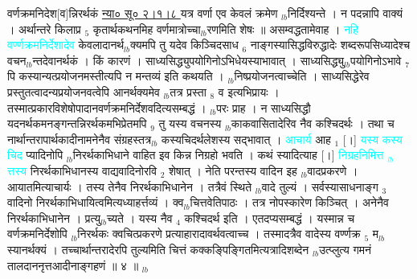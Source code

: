 \documentclass[article,12pt,a4paper]{memoir}%
\newcommand{\quotelemma}[1]{\textcolor{cyan}{#1}}
\newcounter{parCount}
\begin{document}
	  
	  \pstart \leavevmode%
	\hphantom{.}वर्णक्रमनिदेश[व]न्निरर्थकं \href{http://sarit.indology.info/?cref=ns\%C5\%AB.2.1.8}{न्या० सू० २।१।८ } यत्र वर्णा एव केवलं क्रमेण {\tiny $_{lb}$}निर्दिश्यन्ते । न पदन्नापि वाक्यं । अर्थान्तरे किलाप्र {\tiny $_{5}$} कृतार्थकथनमिह वर्णमात्रोच्चा{\tiny $_{lb}$}रणमिति शेषः ॥ असम्वद्धतामेवाह । \quotelemma{नहि वर्ण्णक्रमनिर्देशादेव} \cite[13a9]{vn-msN} केवलादानर्थ{\tiny $_{lb}$}क्यमपि तु यदेव किञ्चिदसाध {\tiny $_{6}$} नाङ्गस्यासिद्धविरुद्धादेः शब्दरूपसिध्यादेश्च वचन{\tiny $_{lb}$}न्तदेवानर्थकं । किं कारणं । साध्यसिद्ध्युपयोगिनोऽभिधेयस्याभावात् । साध्यसिद्ध्यु{\tiny $_{lb}$}पयोगिनोऽभावे {\tiny $_{7}$} पि कस्यान्यत्प्रयोजनमस्तीत्यपि न मन्तव्यं इति कथयति । {\tiny $_{lb}$}निष्प्रयोजनत्वाच्चेति । साध्यसिद्धेरेव प्रस्तुतत्वादन्यप्रयोजनवत्वेपि आनर्थक्यमेव {\tiny $_{lb}$}तत्र प्रस्ता {\tiny $_{8}$} व इत्यभिप्रायः । तस्मात्प्रकारविशेषोपादानवर्णक्रमनिर्देशवदित्यसम्बद्धं । {\tiny $_{lb}$}परः प्राह । न साध्यसिद्धौ यदनर्थकमनङ्गन्तन्निरर्थकमभिप्रेतमपि {\tiny $_{9}$} \leavevmode{} तु यस्य वचनस्य {\tiny $_{lb}$}काकवासितादेरिव नैव कश्चिदर्थः । तथा च नार्थान्तरापार्थकादीनामनेनैव संग्रहस्तत्र{\tiny $_{lb}$}\leavevmode{} कस्यचिदर्थलेशस्य सद्भावात् । \quotelemma{आचार्य} आह {\tiny $_{1}$} [।] \quotelemma{यस्य कस्य चिद} \cite[13b3]{vn-msN} प्यादिनोपि {\tiny $_{lb}$}निरर्थकाभिधाने वाहित इव किन्न निग्रहो भवति । कथं स्यादित्याह [।] \quotelemma{निग्रहनिमित्त {\tiny $_{lb}$}त्तस्य} निरर्थकाभिधानस्य वाद्यवादिनोरवि {\tiny $_{2}$} शेषात् । नेति परन्तस्य वादिन इह {\tiny $_{lb}$}वादप्रकरणे । आयातमित्याचार्यः । तस्य तेनैव निरर्थकाभिधानेन । तत्रैवं स्थिते {\tiny $_{lb}$}वादे तुल्यं । सर्वस्यासाधनाङ्ग {\tiny $_{3}$} वादिनो निरर्थकाभिधायित्वमित्यध्याहर्त्तव्यं । क्व{\tiny $_{lb}$}चित्तवेतिपाठः । तत्र नोपस्कारेण किञ्चित् । अनेनैव निरर्थकाभिधानेन । प्रत्यु{\tiny $_{lb}$}च्यते । यस्य नैव {\tiny $_{4}$} कश्चिदर्थ इति । एतदप्यसम्बद्धं । यस्मान्न च वर्णक्रमनिर्देशोपि {\tiny $_{lb}$}निरर्थकः क्वचित्प्रकरणे प्रत्याहारादावर्थवत्वाच्च । तस्मादत्रैव वादेस्य वर्ण्णक्र {\tiny $_{5}$} म{\tiny $_{lb}$}स्यानर्थक्यं । तच्चार्थान्तरादेरपि तुल्यमिति चित्तं कक्कङ्पिङ्गितमित्यत्रादिशब्देन {\tiny $_{lb}$}उत्प्लुत्य गमनं तालदाननृत्तआदीनाङ्गहणं ॥ ४ ॥
	{}
	\pend%
      {\tiny $_{lb}$}
\end{document}
